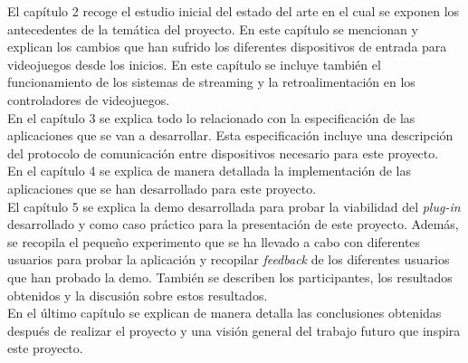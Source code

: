 El cap\'itulo 2 recoge el estudio inicial del estado del arte en el cual se exponen los antecedentes de la tem\'atica del proyecto. En este cap\'itulo se mencionan y explican los cambios que han sufrido los diferentes dispositivos de entrada para videojuegos desde los inicios. En este cap\'itulo se incluye tambi\'en el funcionamiento de los sistemas de streaming y la retroalimentaci\'on en los controladores de videojuegos.\\

En el cap\'itulo 3 se explica todo lo relacionado con la especificaci\'on de las aplicaciones que se van a desarrollar. Esta especificaci\'on incluye una descripci\'on del protocolo de comunicaci\'on entre dispositivos necesario para este proyecto.\\

En el cap\'itulo 4 se explica de manera detallada la implementaci\'on de las aplicaciones que se han desarrollado para este proyecto.\\

El cap\'itulo 5 se explica la demo desarrollada para probar la viabilidad del \textit{plug-in} desarrollado y como caso pr\'actico para la presentaci\'on de este proyecto. Adem\'as, se recopila el peque\~no experimento que se ha llevado a cabo con diferentes usuarios para probar la aplicaci\'on y recopilar \textit{feedback} de los diferentes usuarios que han probado la demo. Tambi\'en se describen los participantes, los resultados obtenidos y la discusi\'on sobre estos resultados.\\

En el \'ultimo cap\'itulo se explican de manera detalla las conclusiones obtenidas despu\'es de realizar el proyecto y una visi\'on general del trabajo futuro que inspira este proyecto.






